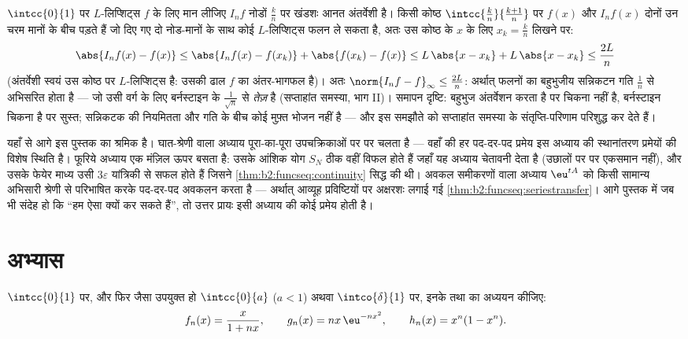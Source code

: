 \begin{example}[बहुभुजीय सन्निकटन, दर सहित]\label{ex:b2:funcseq:polygonal}
$\intcc{0}{1}$ पर $L$-लिप्शिट्स $f$ के लिए मान लीजिए $I_nf$ नोडों $\frac kn$ पर खंडशः आनत
अंतर्वेशी है। किसी कोष्ठ $\intcc{\frac kn}{\frac{k+1}n}$ पर $f(x)$ और $I_nf(x)$ दोनों उन चरम मानों के बीच
पड़ते हैं जो दिए गए दो नोड-मानों के साथ कोई $L$-लिप्शिट्स फलन ले सकता है,
अतः उस कोष्ठ के $x$ के लिए $x_k = \frac kn$ लिखने पर:
\[
\abs{I_nf(x) - f(x)}
\leq \abs{I_nf(x) - f(x_k)} + \abs{f(x_k) - f(x)}
\leq L\,\abs{x - x_k} + L\,\abs{x - x_k}
\leq \frac{2L}{n}
\]
(अंतर्वेशी स्वयं उस कोष्ठ पर $L$-लिप्शिट्स है: उसकी ढाल $f$ का
अंतर-भागफल है)। अतः $\norm{I_nf -
f}_\infty \leq \frac{2L}{n}$: अर्थात्  फलनों का बहुभुजीय सन्निकटन
गति $\frac1n$ से अभिसरित होता है --- जो उसी वर्ग के लिए बर्नस्टाइन के $\frac{1}{\sqrt n}$ से
\emph{तेज़} है (सप्ताहांत समस्या, भाग II)। समापन दृष्टि: बहुभुज अंतर्वेशन
करता है पर चिकना नहीं है, बर्नस्टाइन चिकना है पर सुस्त; सन्निकटक की
नियमितता और गति के बीच कोई मुफ़्त भोजन नहीं है --- और इस समझौते को
सप्ताहांत समस्या के संतृप्ति-परिणाम परिशुद्ध कर देते हैं।
\end{example}

\begin{remark}[इसी खंड के भीतर के परिप्रेक्ष्य]
यहाँ से आगे  इस पुस्तक का श्रमिक है। घात-श्रेणी वाला अध्याय
पूरा-का-पूरा  उपचक्रिकाओं पर  पर चलता है --- वहाँ की हर
पद-दर-पद प्रमेय इस अध्याय की स्थानांतरण प्रमेयों की विशेष स्थिति है।
फूरिये अध्याय एक मंज़िल ऊपर बसता है: उसके आंशिक योग $S_N$ ठीक वहीं विफल होते
हैं जहाँ यह अध्याय चेतावनी देता है (उछालों पर  पर एकसमान नहीं), और
उसके फेयेर माध्य उसी $3\varepsilon$ यांत्रिकी से सफल होते हैं जिसने \cref{thm:b2:funcseq:continuity} सिद्ध की थी।
अवकल समीकरणों वाला अध्याय $\eu^{tA}$ को किसी सामान्य अभिसारी श्रेणी से परिभाषित
करके पद-दर-पद अवकलन करता है --- अर्थात् आव्यूह प्रविष्टियों पर अक्षरशः
लगाई गई \cref{thm:b2:funcseq:seriestransfer}। आगे पुस्तक में जब भी संदेह हो कि ``हम ऐसा क्यों कर सकते
हैं'', तो उत्तर प्रायः इसी अध्याय की कोई प्रमेय होती है।
\end{remark}

\section{अभ्यास}

\begin{exercise}[$\star$]\label{exo:b2:funcseq:1}
$\intcc{0}{1}$ पर, और फिर जैसा उपयुक्त हो $\intcc{0}{a}$ ($a < 1$) अथवा $\intco{\delta}{1}$ पर, इनके  तथा
 का अध्ययन कीजिए:
\[
f_n(x) = \frac{x}{1 + nx},
\qquad
g_n(x) = n x\,\eu^{-n x^2},
\qquad
h_n(x) = x^n(1 - x^n).
\]
\end{exercise}

